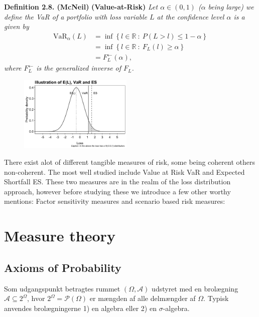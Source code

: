 \documentclass[
]{book}
\begin{document}
\textbf{Definition 2.8. (McNeil)} \textbf{(Value-at-Risk)} \emph{Let \(\alpha\in (0,1)\) (\(\alpha\) being large) we define the VaR of a portfolio with loss variable \(L\) at the confidence level \(\alpha\) is a given by}
\begin{align*}
\text{VaR}_\alpha(L)&=\inf\left\{ l\in\mathbb{R}\ :\ P(L>l)\le 1-\alpha \right\}\\
&=\inf\left\{ l\in\mathbb{R}\ :\ F_L(l)\ge \alpha \right\}\\
&=F^{\leftarrow}_L(\alpha),
\end{align*}
\emph{where \(F^{\leftarrow}_L\) is the generalized inverse of \(F_L\).}

\begin{figure}
  \begin{center}
    \includegraphics[width=0.48\textwidth]{figures/VaR_ES.png}
  \end{center}
\end{figure}

There exist alot of different tangible measures of risk, some being coherent others non-coherent. The most well studied include Value at Risk VaR and Expected Shortfall ES. These two measures are in the realm of the loss distribution approach, however before studying these we introduce a few other worthy mentions: Factor sensitivity measures and scenario based risk measures:

\hypertarget{measure-theory}{%
\chapter{Measure theory}\label{measure-theory}}

\hypertarget{axioms-of-probability}{%
\section{Axioms of Probability}\label{axioms-of-probability}}

Som udgangspunkt betragtes rummet \((\Omega,\mathcal{A})\) udstyret med en brolægning \(\mathcal{A}\subseteq 2^\Omega\), hvor \(2^\Omega=\mathcal{P}(\Omega)\) er mængden af alle delmængder af \(\Omega\). Typisk anvendes brolægningerne 1) en algebra eller 2) en \(\sigma\)-algebra.
\end{document}
